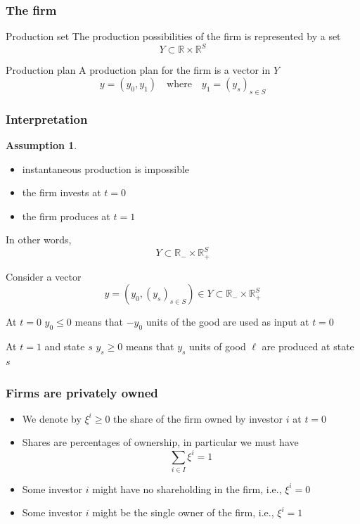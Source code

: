\documentclass[blue]{beamer}
\def\R{\mathbb{R}}
\def\leq{\leqslant}
\def\geq{\geqslant}
\theoremstyle{definition}
\newtheorem*{assumption}{Assumption}
\theoremstyle{example}
\begin{document}

\begin{frame}\frametitle{The firm}

\begin{block}{Production set}
The production possibilities of the firm is represented by a set
\[
Y \subset \R \times \R^S
\]
\end{block}

\begin{block}{Production plan}
A production plan for the firm is a vector in $Y$
\[
y = (y_0,y_1) \quad \textrm{where} \quad y_1=(y_s)_{s\in S}
\]
\end{block}


\end{frame}


\begin{frame}\frametitle{Interpretation}

\begin{assumption}
    \begin{itemize}
    \item instantaneous production is impossible
    \item the firm invests at $t=0$
    \item the firm produces at $t=1$
    \end{itemize}
In other words,
\[
Y \subset \R_{-} \times \R^S_{+}
\]
\end{assumption}

Consider a vector
\[
y=(y_0,(y_s)_{s\in S}) \in Y \subset \R_{-} \times \R^S_{+}
\]

\begin{block}{At $t=0$}
$y_0 \leq 0$ means that $-y_0$ units of the good are used as input at $t=0$
\end{block}

\begin{block}{At $t=1$ and state $s$}
$y_s \geq 0$ means that $y_s$ units of good $\ell$ are produced at state $s$
\end{block}


\end{frame}


\begin{frame}\frametitle{Firms are privately owned}

\begin{itemize}
\item We denote by $\xi^i \geq 0$ the share of the firm owned by investor $i$ at $t=0$
\item Shares are percentages of ownership, in particular we must have
\[
\sum_{i\in I} \xi^i =1
\]
\item Some investor $i$ might have no shareholding in the firm, i.e., $\xi^i =0$
\item Some investor $i$ might be the single owner of the firm, i.e., $\xi^i=1$
\end{itemize}

\end{frame}
\end{document}
